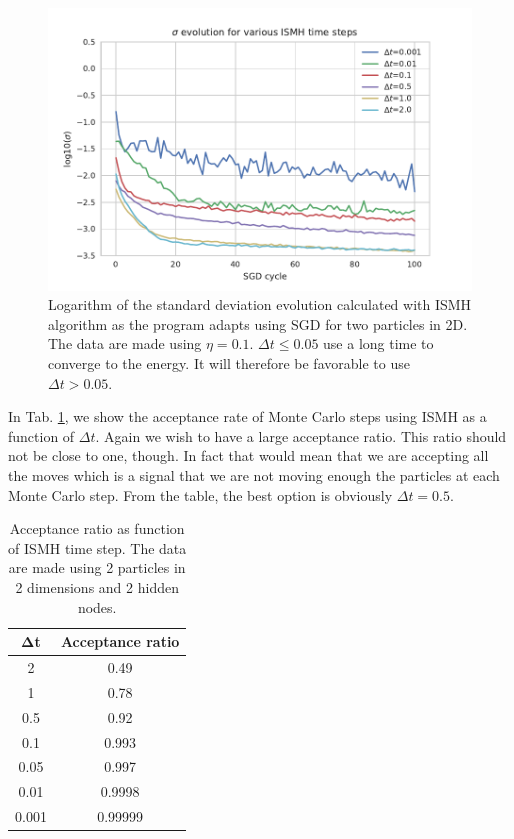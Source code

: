 \begin{figure}[H]
\centering
\includegraphics[scale=1.0]{plot5.pdf}
\caption{Logarithm of the standard deviation evolution calculated with ISMH algorithm as the program adapts using SGD for two particles in 2D. The data are made using $\eta = 0.1$. $\Delta t\leq 0.05$ use a long time to converge to the energy. It will therefore be favorable to use $\Delta t > 0.05$.}
\label{Fig:5}
\end{figure}
In Tab. \ref{Tab:2}, we show the acceptance rate of Monte Carlo steps using ISMH as a function of $\Delta t$. Again we wish to have a large acceptance ratio. This ratio should not be close to one, though.  In fact that would mean that we are accepting all the moves which is a signal that we are not moving enough the particles at each Monte Carlo step. From the table, the best option is obviously $\Delta t = 0.5$. 

\begin{table}[H]
\centering
\caption{Acceptance ratio as function of ISMH time step. The data are made using 2 particles in 2 dimensions and 2 hidden nodes.}
\begin{tabular}{c| c } 
\textbf{$\boldsymbol{\Delta}$t} & \textbf{Acceptance ratio} \\ \hline
2 & 0.49 \\
1 & 0.78 \\
0.5 & 0.92  \\
0.1  &  0.993 \\
0.05  &  0.997 \\
0.01  &  0.9998 \\
0.001 & 0.99999 \\ 
\end{tabular}
\label{Tab:2}
\end{table} 

